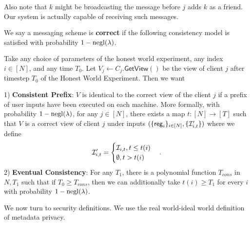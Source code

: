 Also note that $k$ might be broadcasting the message before $j$ adds $k$ as a friend. Our system is actually capable of receiving such messages.
\begin{definition}[Correctness]
\label{defn:correctness}
 We say a messaging scheme is \textbf{correct} if the following consistency model is satisfied with probability $1 - \operatorname{negl}(\lambda)$.
 
 Take any choice of parameters of the honest world experiment, any index $i \in [N]$, and any time $T_0$. Let $V_j \leftarrow C_j.\mathsf{GetView}()$ be the view of client $j$ after timestep $T_0$ of the Honest World Experiment. Then we want

1) \textbf{Consistent Prefix}: $V$ is identical to the correct view of the client $j$ if a prefix of user inputs have been executed on each machine. More formally, with probability $1 - \operatorname{negl}(\lambda)$, for any $j \in [N]$, there exists a map $t: [N] \to [T]$ such that  $V$ is a correct view of client $j$ under inputs $(\{\mathsf{reg}_i\}_{i \in [N]}, \{\mathcal{I}'_{i, t}\})$
where we define
$$\mathcal{I}'_{i, t} = \begin{cases}
\mathcal{I}_{i, t}, t \leq t(i) \\
\emptyset, t > t(i)
\end{cases}.$$
2) \textbf{Eventual Consistency}: For any $T_1$, there is a polynomial function $T_{cons}$ in $N, T_1$ such that if $T_0 \geq T_{cons}$, then we can additionally take $t(i) \geq T_1$ for every $i$ with probability $1 - \operatorname{negl}(\lambda)$.
\end{definition}
We now turn to security definitions. We use the real world-ideal world definition of metadata privacy.
